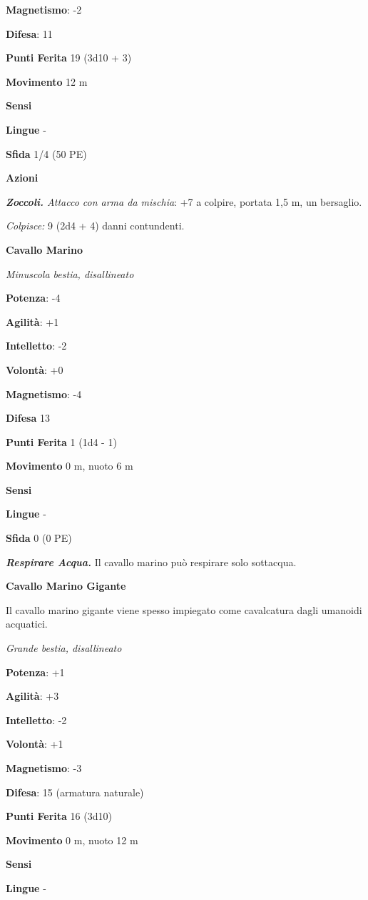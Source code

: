 \begin{multicols}{2}
\textbf{Magnetismo}: -2

\textbf{Difesa}: 11

\textbf{Punti Ferita} 19 (3d10 + 3)

\textbf{Movimento} 12 m

\textbf{Sensi} 

\textbf{Lingue} -

\textbf{Sfida} 1/4 (50 PE)

\textbf{Azioni}

\emph{\textbf{Zoccoli.} Attacco con arma da mischia}: +7 a colpire,
portata 1,5 m, un bersaglio.

\emph{Colpisce:} 9 (2d4 + 4) danni contundenti.

\textbf{Cavallo Marino}

\emph{Minuscola bestia, disallineato}

\textbf{Potenza}: -4

\textbf{Agilità}: +1

\textbf{Intelletto}: -2

\textbf{Volontà}: +0

\textbf{Magnetismo}: -4

\textbf{Difesa} 13

\textbf{Punti Ferita} 1 (1d4 - 1)

\textbf{Movimento} 0 m, nuoto 6 m

\textbf{Sensi} 

\textbf{Lingue} -

\textbf{Sfida} 0 (0 PE)

\emph{\textbf{Respirare Acqua.}} Il cavallo marino può respirare solo
sottacqua.

\textbf{Cavallo Marino Gigante}

Il cavallo marino gigante viene spesso impiegato come cavalcatura dagli
umanoidi acquatici.

\emph{Grande bestia, disallineato}

\textbf{Potenza}: +1

\textbf{Agilità}: +3

\textbf{Intelletto}: -2

\textbf{Volontà}: +1

\textbf{Magnetismo}: -3

\textbf{Difesa}: 15 (armatura naturale)

\textbf{Punti Ferita} 16 (3d10)

\textbf{Movimento} 0 m, nuoto 12 m

\textbf{Sensi} 

\textbf{Lingue} -


\end{multicols}
